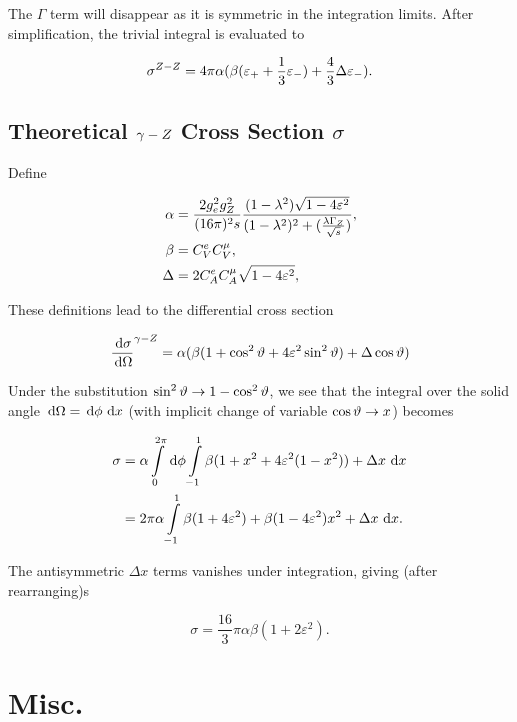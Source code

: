 \documentclass[]{report}
\begin{document}
The $\Gamma$ term will disappear as it is symmetric in the integration limits. After simplification, the trivial integral is evaluated to

$$
\sigma^{\Zzero-\Zzero} = 4\pi\alpha(\beta(\varepsilon_{+} + \frac{1}{3}\varepsilon_{-})
  + \frac{4}{3}\Delta\varepsilon_{-}).
$$

\section{Theoretical $\gamma-Z $ Cross Section $\sigma$}

Define

\begin{align*}
\alpha &= \frac{2g_{e}^{2}g_{\Zzero}^{2}}{(16\pi)^{2}s} \frac{(1-\lambda^{2})\sqrt{1-4\varepsilon^{2}}}{(1-\lambda^{2})^{2} + (\frac{\lambda\Gamma_{\Zzero}}{\rts})},
\\
\beta &= C^{e}_{V}C^{\mu}_{V},
\\
\Delta &= 2C^{e}_{A}C^{\mu}_{A}\sqrt{1-4\varepsilon^{2}},
\end	{align*}

These definitions lead to the differential cross section

$$
\frac{\,\operatorname{d}\!{\sigma}}{\,\operatorname{d}\!{\Omega}}^{\gamma-Z }
  = \alpha(\beta(1+\cos^{2}{\vartheta}+4\varepsilon^{2}\sin^{2}{\vartheta})
    + \Delta\cos{\vartheta}
  )
$$

Under the substitution $\sin^{2}{\vartheta} \rightarrow 1-\cos^{2}{\vartheta}$, we see that the integral over the solid angle $\,\operatorname{d}\!{\Omega} = \,\operatorname{d}\!{\phi}\,\operatorname{d}\!{x}$ (with implicit change of variable $\cos{\vartheta}\rightarrow x$) becomes

\begin{align*}
\sigma &= \alpha \int\limits_{0}^{2\pi}\d{\phi}
	\int\limits_{-1}^{1}
		\beta(1+x^{2}+4\varepsilon^{2}(1- x^{2}))
    	+ \Delta x
	\d{x}
\\
&= 2\pi\alpha \int\limits_{-1}^{1} \beta(1+4\varepsilon^{2})+\beta(1-4\varepsilon^{2})x^{2} + \Delta x \d{x}.
\end{align*}

The antisymmetric $\Delta x$ terms vanishes under integration, giving (after rearranging)s

$$
\sigma = \frac{16}{3}\pi\alpha\beta(1 + 2\varepsilon^{2}).
$$

\chapter{Misc.}
\end{document}
